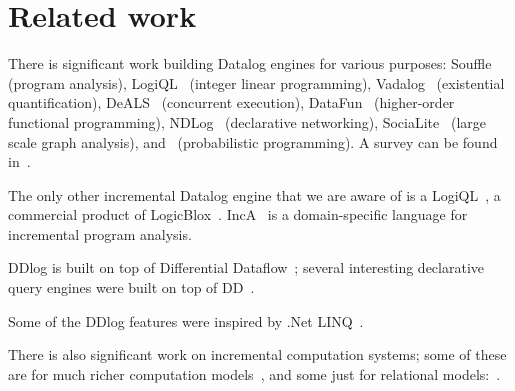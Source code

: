 \section{Related work}

There is significant work building Datalog engines for various
purposes: Souffle~\cite{scholz-cc16} (program analysis),
LogiQL~\cite{Borraz-Sanchez-dlp18} (integer linear programming),
Vadalog~\cite{Bellomarini-vldb18} (existential quantification),
DeALS~\cite{Yang-vldb17} (concurrent execution),
DataFun~\cite{Arntzenius-icfp16} (higher-order functional
programming), NDLog~\cite{loo-cacm09} (declarative networking),
SociaLite~\cite{Seo-vldb13} (large scale graph analysis),
and~\cite{Barany-tods17} (probabilistic programming).  A survey can be
found in~\cite{Maier-book18}.

The only other incremental Datalog engine that we are aware of is a
LogiQL~\cite{Green-pods15}, a commercial product of
LogicBlox~\cite{Aref-sigmod15}.
IncA~\cite{IncA} is a domain-specific language for incremental program
analysis.

DDlog is built on top of Differential Dataflow~\cite{dd}; several
interesting declarative query engines were built on top of
DD~\cite{timely-dataflow,differential-dataflow-paper}.

Some of the DDlog features were inspired by .Net
LINQ~\cite{meijer-dpcool03,Meijer-sigmod06}.

There is also significant work on incremental computation systems;
some of these are for much richer computation
models~\cite{acar-05,Carlsson-icfp02,Demetrescu-oopsla11,harkes-ecoop16,Hammer-pldi14},
and some just for relational
models:~\cite{ahmad-vldb12,Szabo-ase016,zhao-icmd17}.
